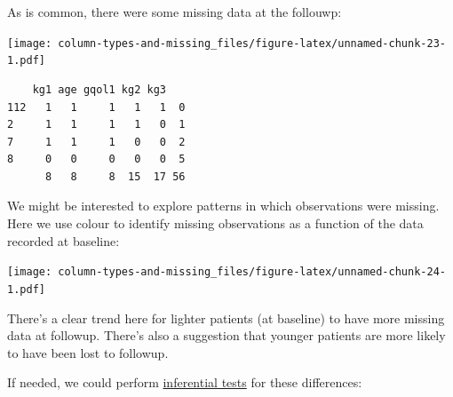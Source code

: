 \documentclass[]{article}
\newenvironment{Shaded}{\begin{snugshade}}{\end{snugshade}}
\newcommand{\DataTypeTok}[1]{\textcolor[rgb]{0.13,0.29,0.53}{#1}}
\newcommand{\KeywordTok}[1]{\textcolor[rgb]{0.13,0.29,0.53}{\textbf{#1}}}
\newcommand{\NormalTok}[1]{#1}
\newcommand{\OperatorTok}[1]{\textcolor[rgb]{0.81,0.36,0.00}{\textbf{#1}}}
\newcommand{\StringTok}[1]{\textcolor[rgb]{0.31,0.60,0.02}{#1}}
\begin{document}
As is common, there were some missing data at the follouwp:

\begin{Shaded}
\end{Shaded}

\texttt{[image: column-types-and-missing\_files/figure-latex/unnamed-chunk-23-1.pdf]}

\begin{verbatim}
    kg1 age gqol1 kg2 kg3   
112   1   1     1   1   1  0
2     1   1     1   1   0  1
7     1   1     1   0   0  2
8     0   0     0   0   0  5
      8   8     8  15  17 56
\end{verbatim}

We might be interested to explore patterns in which observations were missing. Here we use colour to identify missing observations as a function of the data recorded at baseline:

\begin{Shaded}
\end{Shaded}

\texttt{[image: column-types-and-missing\_files/figure-latex/unnamed-chunk-24-1.pdf]}

There's a clear trend here for lighter patients (at baseline) to have more missing data at followup. There's also a suggestion that younger patients are more likely to have been lost to followup.

If needed, we could perform \protect\hyperlink{common-stats}{inferential tests} for these differences:
\end{document}
